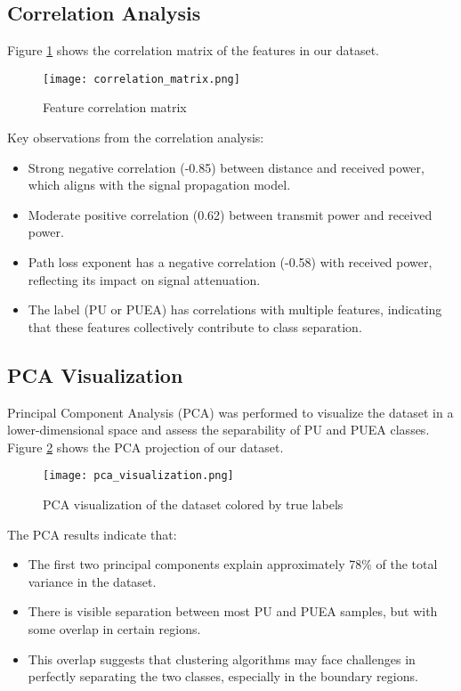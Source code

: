 \subsection{Correlation Analysis}
Figure \ref{fig:correlation_matrix} shows the correlation matrix of the features in our dataset.

\begin{figure}[h]
    \centering
    \texttt{[image: correlation\_matrix.png]}
    \caption{Feature correlation matrix}
    \label{fig:correlation_matrix}
\end{figure}

Key observations from the correlation analysis:
\begin{itemize}
    \item Strong negative correlation (-0.85) between distance and received power, which aligns with the signal propagation model.
    \item Moderate positive correlation (0.62) between transmit power and received power.
    \item Path loss exponent has a negative correlation (-0.58) with received power, reflecting its impact on signal attenuation.
    \item The label (PU or PUEA) has correlations with multiple features, indicating that these features collectively contribute to class separation.
\end{itemize}

\subsection{PCA Visualization}
Principal Component Analysis (PCA) was performed to visualize the dataset in a lower-dimensional space and assess the separability of PU and PUEA classes. Figure \ref{fig:pca_visualization} shows the PCA projection of our dataset.

\begin{figure}[h]
    \centering
    \texttt{[image: pca\_visualization.png]}
    \caption{PCA visualization of the dataset colored by true labels}
    \label{fig:pca_visualization}
\end{figure}

The PCA results indicate that:
\begin{itemize}
    \item The first two principal components explain approximately 78\% of the total variance in the dataset.
    \item There is visible separation between most PU and PUEA samples, but with some overlap in certain regions.
    \item This overlap suggests that clustering algorithms may face challenges in perfectly separating the two classes, especially in the boundary regions.
\end{itemize}

